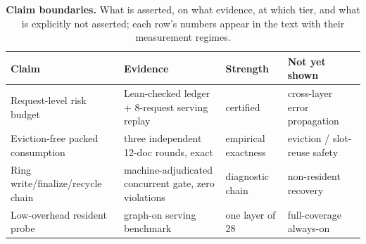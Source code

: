 \begin{table}[t]\centering\small
\begin{tabular}{@{}>{\raggedright\arraybackslash}p{}>{\raggedright\arraybackslash}p{}>{\raggedright\arraybackslash}p{}>{\raggedright\arraybackslash}p{}@{}}
\toprule
Claim & Evidence & Strength & Not yet shown\\
\midrule
Request-level risk budget &
Lean-checked ledger + 8-request serving replay &
certified &
cross-layer error propagation\\
Eviction-free packed consumption &
three independent 12-doc rounds, exact &
empirical exactness &
eviction / slot-reuse safety\\
Ring write/finalize/recycle chain &
machine-adjudicated concurrent gate, zero violations &
diagnostic chain &
non-resident recovery\\
Low-overhead resident probe &
graph-on serving benchmark &
one layer of 28 &
full-coverage always-on\\
\bottomrule
\end{tabular}
\caption{\textbf{Claim boundaries.} What is asserted, on what evidence, at
which tier, and what is explicitly not asserted; each row's numbers appear
in the text with their measurement regimes.}
\label{tab:boundary}
\end{table}
